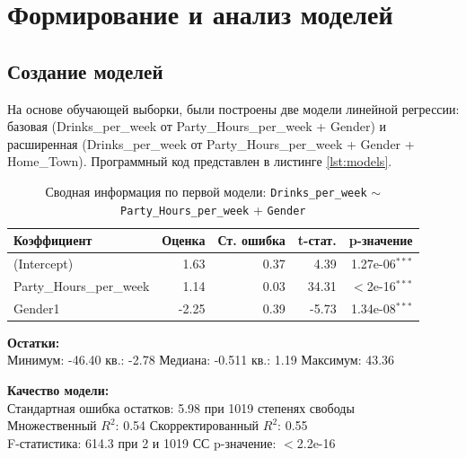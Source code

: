 \chapter{Формирование и анализ моделей}
\section{Создание моделей}
На основе обучающей выборки, были построены две модели линейной регрессии\cite{wapnick2009}: базовая (Drinks\_per\_week от Party\_Hours\_per\_week + Gender) и расширенная (Drinks\_per\_week от Party\_Hours\_per\_week + Gender + Home\_Town). Программный код представлен в листинге \ref{lst:models}.


\begin{table}[h]
	\centering
	\caption{Сводная информация по первой модели: \texttt{Drinks\_per\_week} $\sim$ \texttt{Party\_Hours\_per\_week} + \texttt{Gender}}
	\begin{tabular}{lrrrr}
		\hline
		\textbf{Коэффициент} & \textbf{Оценка} & \textbf{Ст. ошибка} & \textbf{t-стат.} & \textbf{p-значение} \\
		\hline
		(Intercept)             & 1.63  & 0.37 & 4.39  & 1.27e-06$^{***}$ \\
		Party\_Hours\_per\_week & 1.14  & 0.03 & 34.31 & $<$2e-16$^{***}$ \\
		Gender1                 & -2.25 & 0.39 & -5.73 & 1.34e-08$^{***}$ \\
		\hline
	\end{tabular}
	\vspace{0.5em}
	
	\textbf{Остатки:} \\
	Минимум: -46.40  кв.: -2.78 \quad Медиана: -0.511  кв.: 1.19 \quad Максимум: 43.36
	
	\vspace{0.5em}
	\textbf{Качество модели:} \\
	Стандартная ошибка остатков: 5.98 при 1019 степенях свободы \\
	Множественный $R^2$: 0.54 \quad Скорректированный $R^2$: 0.55 \\
	F-статистика: 614.3 при 2 и 1019 СС \quad p-значение: $<$2.2e-16
	\label{tab:m1}
\end{table}

